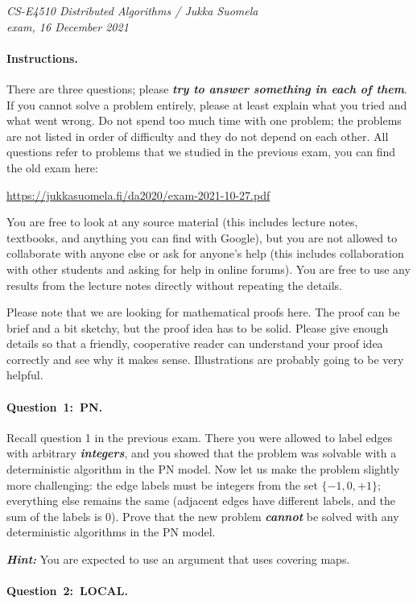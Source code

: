 \documentclass[12pt,a4paper]{article}
\newcommand{\q}[2]{\paragraph{\mbox{Question #1: }#2.}}
\newcommand{\hl}[1]{\textbf{\emph{#1}}}
\newcommand{\cemph}[1]{\textcolor{hlcolor}{\textbf{\emph{\boldmath #1}}}}
\begin{document}
\noindent
\emph{CS-E4510 Distributed Algorithms / Jukka Suomela\\
exam, 16 December 2021}

\paragraph{Instructions.}

There are three questions; please \cemph{try to answer something in each of them}. If you cannot solve a problem entirely, please at least explain what you tried and what went wrong. Do not spend too much time with one problem; the problems are not listed in order of difficulty and they do not depend on each other. All questions refer to problems that we studied in the previous exam, you can find the old exam here:
\begin{center}
\url{https://jukkasuomela.fi/da2020/exam-2021-10-27.pdf}
\end{center}

You are free to look at any source material (this includes lecture notes, textbooks, and anything you can find with Google), but you are not allowed to collaborate with anyone else or ask for anyone's help (this includes collaboration with other students and asking for help in online forums). You are free to use any results from the lecture notes directly without repeating the details.

Please note that we are looking for mathematical proofs here. The proof can be brief and a bit sketchy, but the proof idea has to be solid. Please give enough details so that a friendly, cooperative reader can understand your proof idea correctly and see why it makes sense. Illustrations are probably going to be very helpful.

\q{1}{PN}

Recall question 1 in the previous exam. There you were allowed to label edges with arbitrary \cemph{integers}, and you showed that the problem was solvable with a deterministic algorithm in the PN model. Now let us make the problem slightly more challenging: the edge labels must be integers from the set \cemph{$\{-1, 0, +1\}$}; everything else remains the same (adjacent edges have different labels, and the sum of the labels is $0$). Prove that the new problem \hl{cannot} be solved with any deterministic algorithms in the PN model.

\medskip
\noindent\hl{Hint:} You are expected to use an argument that uses covering maps.

\q{2}{LOCAL}
\end{document}
